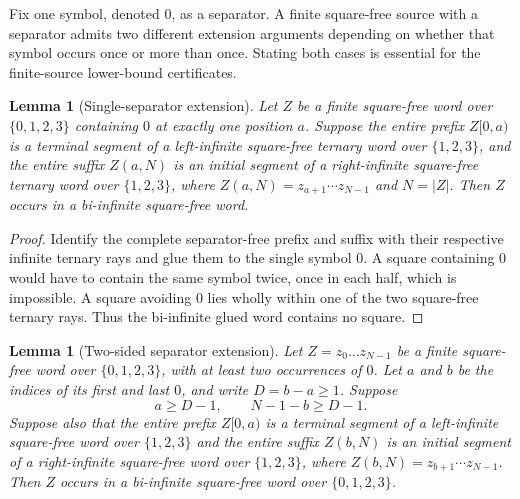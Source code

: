 \documentclass[11pt]{article}
\newtheorem{lemma}[theorem]{Lemma}
\theoremstyle{remark}
\newcommand{\SigmaFour}{\{0,1,2,3\}}
\begin{document}
Fix one symbol, denoted $0$, as a separator. A finite
square-free source with a separator admits two different extension
arguments depending on whether that symbol occurs once or more
than once. Stating both cases is essential for the finite-source
lower-bound certificates.

\begin{lemma}[Single-separator extension]\label{lem:single-separator}
Let $Z$ be a finite square-free word over $\SigmaFour$
containing $0$ at exactly one position $a$. Suppose the entire
prefix $Z[0,a)$ is a terminal segment of a left-infinite
square-free ternary word over $\{1,2,3\}$, and the entire
suffix $Z(a,N)$ is an initial segment of a right-infinite
square-free ternary word over $\{1,2,3\}$, where
$Z(a,N)=z_{a+1}\cdots z_{N-1}$ and $N=|Z|$.
Then $Z$ occurs in a bi-infinite square-free word.
\end{lemma}
\begin{proof}
Identify the complete separator-free prefix and suffix
with their respective infinite ternary rays and glue them
to the single symbol $0$. A square containing $0$ would
have to contain the same symbol twice, once in each half,
which is impossible. A square avoiding $0$ lies wholly
within one of the two square-free ternary rays. Thus the
bi-infinite glued word contains no square.
\end{proof}

\begin{lemma}[Two-sided separator extension]\label{lem:separator}
Let $Z=z_0\ldots z_{N-1}$ be a finite square-free word over
$\SigmaFour$, with at least two occurrences of $0$. Let $a$ and $b$
be the indices of its first and last $0$, and write $D=b-a\ge1$.
Suppose
\[
   a\ge D-1,\qquad N-1-b\ge D-1.
\]
Suppose also that the \emph{entire} prefix $Z[0,a)$ is a terminal
segment of a left-infinite square-free word over $\{1,2,3\}$ and
the \emph{entire} suffix $Z(b,N)$ is an initial segment of a
right-infinite square-free word over $\{1,2,3\}$, where
$Z(b,N)=z_{b+1}\cdots z_{N-1}$.
Then $Z$ occurs in a bi-infinite square-free word over $\SigmaFour$.
\end{lemma}
\end{document}
